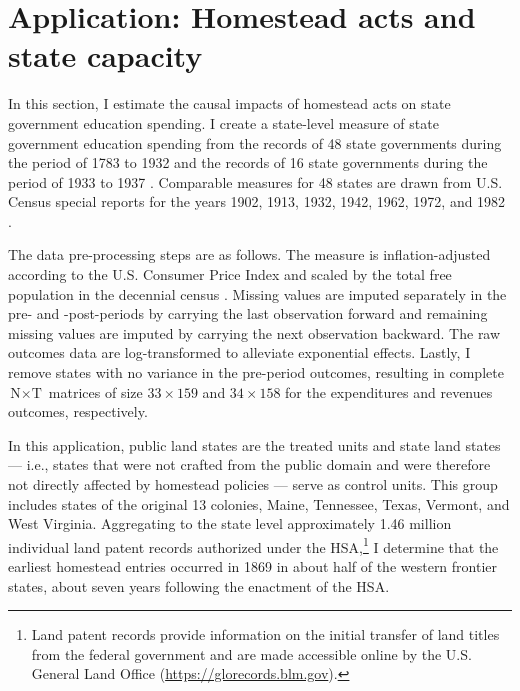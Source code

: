 \documentclass[hidelinks,12pt]{article}
\begin{document}
\section{Application: Homestead acts and state capacity} \label{state-capacity}

In this section, I estimate the causal impacts of homestead acts on state government education spending. I create a state-level measure of state government education spending from the records of 48 state governments during the period of 1783 to 1932 \citep{sylla1993sources} and the records of 16 state governments during the period of 1933 to 1937 \citep{sylla1995sourcesa,sylla1995sourcesb}. Comparable measures for 48 states are drawn from U.S. Census special reports for the years 1902, 1913, 1932, 1942, 1962, 1972, and 1982 \citep{haines2010}.

The data pre-processing steps are as follows. The measure is inflation-adjusted according to the U.S. Consumer Price Index \citep{williamson2017seven} and scaled by the total free population in the decennial census \citep{haines2010}. Missing values are imputed separately in the pre- and -post-periods by carrying the last observation forward and remaining missing values are imputed by carrying the next observation backward. The raw outcomes data are log-transformed to alleviate exponential effects. Lastly, I remove states with no variance in the pre-period outcomes, resulting in complete $\text{N} \times \text{T}$ matrices of size $33 \times 159$ and $34 \times 158$ for the expenditures and revenues outcomes, respectively. 

In this application, public land states are the treated units and state land states --- i.e., states that were not crafted from the public domain and were therefore not directly affected by homestead policies --- serve as control units. This group includes states of the original 13 colonies, Maine, Tennessee, Texas, Vermont, and West Virginia. Aggregating to the state level approximately 1.46 million individual land patent records authorized under the HSA,\footnote{Land patent records provide information on the initial transfer of land titles from the federal government and are made accessible online by the U.S. General Land Office (\url{https://glorecords.blm.gov}).} I determine that the earliest homestead entries occurred in 1869 in about half of the western frontier states, about seven years following the enactment of the HSA.

\end{document}
